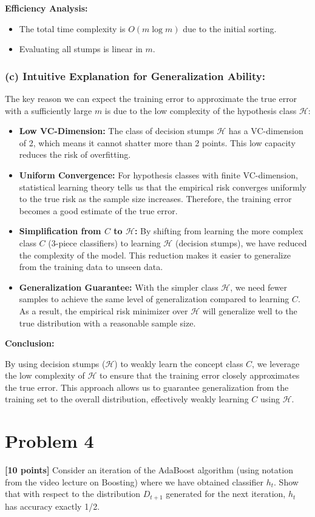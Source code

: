 \documentclass{article}
\begin{document}
\textbf{Efficiency Analysis:}
\begin{itemize}
    \item The total time complexity is \(O(m \log m)\) due to the initial sorting.
    \item Evaluating all stumps is linear in \(m\).
\end{itemize}

\subsubsection*{(c) Intuitive Explanation for Generalization Ability:}

The key reason we can expect the training error to approximate the true error with a sufficiently large \(m\) is due to the low complexity of the hypothesis class \(\mathcal{H}\):

\begin{itemize}
    \item \textbf{Low VC-Dimension:} The class of decision stumps \(\mathcal{H}\) has a VC-dimension of 2, which means it cannot shatter more than 2 points. This low capacity reduces the risk of overfitting.
    \item \textbf{Uniform Convergence:} For hypothesis classes with finite VC-dimension, statistical learning theory tells us that the empirical risk converges uniformly to the true risk as the sample size increases. Therefore, the training error becomes a good estimate of the true error.
    \item \textbf{Simplification from \(C\) to \(\mathcal{H}\):} By shifting from learning the more complex class \(C\) (3-piece classifiers) to learning \(\mathcal{H}\) (decision stumps), we have reduced the complexity of the model. This reduction makes it easier to generalize from the training data to unseen data.
    \item \textbf{Generalization Guarantee:} With the simpler class \(\mathcal{H}\), we need fewer samples to achieve the same level of generalization compared to learning \(C\). As a result, the empirical risk minimizer over \(\mathcal{H}\) will generalize well to the true distribution with a reasonable sample size.
\end{itemize}

\textbf{Conclusion:}

By using decision stumps (\(\mathcal{H}\)) to weakly learn the concept class \(C\), we leverage the low complexity of \(\mathcal{H}\) to ensure that the training error closely approximates the true error. This approach allows us to guarantee generalization from the training set to the overall distribution, effectively weakly learning \(C\) using \(\mathcal{H}\).

\section*{Problem 4}

\textbf{[10 points]} Consider an iteration of the AdaBoost algorithm (using notation from the video lecture on Boosting) where we have obtained classifier $h_t$. Show that with respect to the distribution $D_{t+1}$ generated for the next iteration, $h_t$ has accuracy exactly 1/2.
\end{document}
